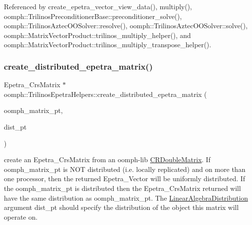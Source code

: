 Referenced by create\+\_\+epetra\+\_\+vector\+\_\+view\+\_\+data(), multiply(), oomph\+::\+Trilinos\+Preconditioner\+Base\+::preconditioner\+\_\+solve(), oomph\+::\+Trilinos\+Aztec\+O\+O\+Solver\+::resolve(), oomph\+::\+Trilinos\+Aztec\+O\+O\+Solver\+::solve(), oomph\+::\+Matrix\+Vector\+Product\+::trilinos\+\_\+multiply\+\_\+helper(), and oomph\+::\+Matrix\+Vector\+Product\+::trilinos\+\_\+multiply\+\_\+transpose\+\_\+helper().

\mbox{\label{namespaceoomph_1_1TrilinosEpetraHelpers_a0a8d24c6cf06d8c71bb414c153a276cf}} 
\subsubsection{\texorpdfstring{create\+\_\+distributed\+\_\+epetra\+\_\+matrix()}{create\_distributed\_epetra\_matrix()}}
{\footnotesize\ttfamily Epetra\+\_\+\+Crs\+Matrix $\ast$ oomph\+::\+Trilinos\+Epetra\+Helpers\+::create\+\_\+distributed\+\_\+epetra\+\_\+matrix (\begin{DoxyParamCaption}\item[{const \hyperlink{classoomph_1_1CRDoubleMatrix}{C\+R\+Double\+Matrix} $\ast$}]{oomph\+\_\+matrix\+\_\+pt,  }\item[{const \hyperlink{classoomph_1_1LinearAlgebraDistribution}{Linear\+Algebra\+Distribution} $\ast$}]{dist\+\_\+pt }\end{DoxyParamCaption})}



create an Epetra\+\_\+\+Crs\+Matrix from an oomph-\/lib \hyperlink{classoomph_1_1CRDoubleMatrix}{C\+R\+Double\+Matrix}. If oomph\+\_\+matrix\+\_\+pt is N\+OT distributed (i.\+e. locally replicated) and on more than one processor, then the returned Epetra\+\_\+\+Vector will be uniformly distributed. If the oomph\+\_\+matrix\+\_\+pt is distributed then the Epetra\+\_\+\+Crs\+Matrix returned will have the same distribution as oomph\+\_\+matrix\+\_\+pt. The \hyperlink{classoomph_1_1LinearAlgebraDistribution}{Linear\+Algebra\+Distribution} argument dist\+\_\+pt should specify the distribution of the object this matrix will operate on. 



